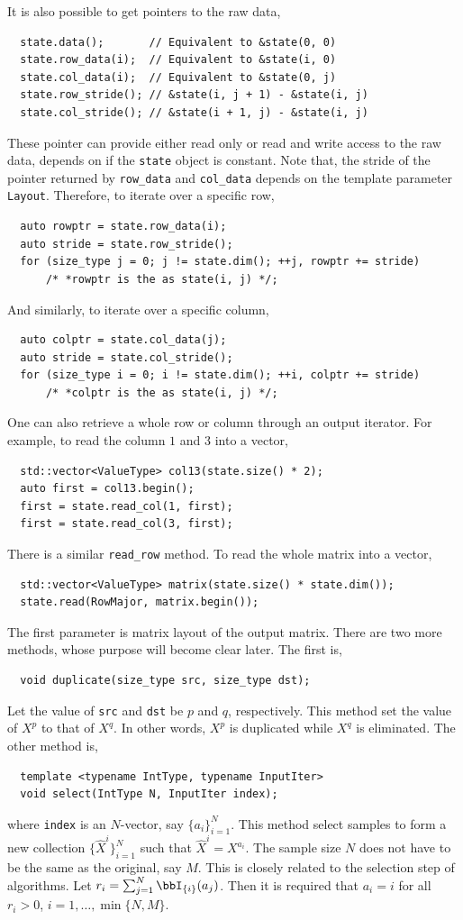 It is also possible to get pointers to the raw data,
\begin{Verbatim}
  state.data();       // Equivalent to &state(0, 0)
  state.row_data(i);  // Equivalent to &state(i, 0)
  state.col_data(i);  // Equivalent to &state(0, j)
  state.row_stride(); // &state(i, j + 1) - &state(i, j)
  state.col_stride(); // &state(i + 1, j) - &state(i, j)
\end{Verbatim}
These pointer can provide either read only or read and write access to the raw
data, depends on if the \verb|state| object is constant. Note that, the stride
of the pointer returned by \verb|row_data| and \verb|col_data| depends on the
template parameter \verb|Layout|. Therefore, to iterate over a specific row,
\begin{Verbatim}
  auto rowptr = state.row_data(i);
  auto stride = state.row_stride();
  for (size_type j = 0; j != state.dim(); ++j, rowptr += stride)
      /* *rowptr is the as state(i, j) */; 
\end{Verbatim}
And similarly, to iterate over a specific column,
\begin{Verbatim}
  auto colptr = state.col_data(j);
  auto stride = state.col_stride();
  for (size_type i = 0; i != state.dim(); ++i, colptr += stride)
      /* *colptr is the as state(i, j) */; 
\end{Verbatim}
One can also retrieve a whole row or column through an output iterator. For
example, to read the column $1$ and $3$ into a vector,
\begin{Verbatim}
  std::vector<ValueType> col13(state.size() * 2);
  auto first = col13.begin();
  first = state.read_col(1, first);
  first = state.read_col(3, first);
\end{Verbatim}
There is a similar \verb|read_row| method. To read the whole matrix into a
vector,
\begin{Verbatim}
  std::vector<ValueType> matrix(state.size() * state.dim());
  state.read(RowMajor, matrix.begin());
\end{Verbatim}
The first parameter is matrix layout of the output matrix. There are two more
methods, whose purpose will become clear later. The first is,
\begin{Verbatim}
  void duplicate(size_type src, size_type dst);
\end{Verbatim}
Let the value of \verb|src| and \verb|dst| be $p$ and $q$, respectively. This
method set the value of $X^p$ to that of $X^q$. In other words, $X^p$ is
duplicated while $X^q$ is eliminated. The other method is,
\begin{Verbatim}
  template <typename IntType, typename InputIter>
  void select(IntType N, InputIter index);
\end{Verbatim}
where \verb|index| is an $N$-vector, say $\{a_i\}_{i=1}^N$. This method select
samples to form a new collection $\{\hat{X}^i\}_{i=1}^N$ such that $\hat{X}^i =
X^{a_i}$. The sample size $N$ does not have to be the same as the original, say
$M$. This is closely related to the selection step of \smc algorithms. Let $r_i
= \sum_{j = 1}^N\bbI_{\{i\}}(a_j)$. Then it is required that $a_i = i$ for all
$r_i > 0$, $i = 1,\dots,\min\{N, M\}$.

